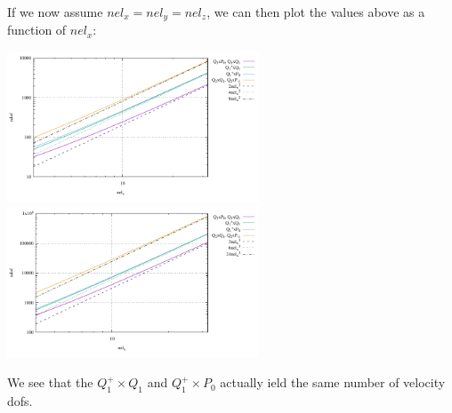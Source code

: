 If we now assume $nel_x=nel_y=nel_z$, we can then plot the values above as a function of $nel_x$:
\begin{center}
\includegraphics[width=7.5cm]{images/elements/ndof2D.pdf}
\includegraphics[width=7.5cm]{images/elements/ndof3D.pdf}
\end{center}

We see that the $Q_1^+\times Q_1$ and $Q_1^+ \times P_0$ actually 
ield the same number of velocity dofs. 

